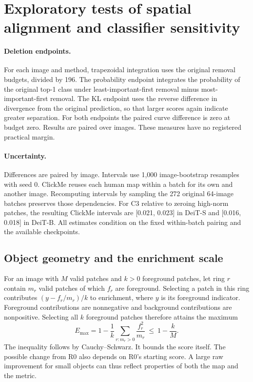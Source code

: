 \section{Exploratory tests of spatial alignment and classifier sensitivity}\label{app:explore}
\paragraph{Deletion endpoints.} For each image and method, trapezoidal integration uses the original removal budgets, divided by 196. The probability endpoint integrates the probability of the original top-1 class under least-important-first removal minus most-important-first removal. The KL endpoint uses the reverse difference in divergence from the original prediction, so that larger scores again indicate greater separation. For both endpoints the paired curve difference is zero at budget zero. Results are paired over images. These measures have no registered practical margin.
\paragraph{Uncertainty.} Differences are paired by image. Intervals use 1,000 image-bootstrap resamples with seed 0. ClickMe reuses each human map within a batch for its own and another image. Recomputing intervals by sampling the 272 original 64-image batches preserves those dependencies. For C3 relative to zeroing high-norm patches, the resulting ClickMe intervals are [0.021, 0.023] in DeiT-S and [0.016, 0.018] in DeiT-B. All estimates condition on the fixed within-batch pairing and the available checkpoints.
\begin{center}\begin{minipage}{\linewidth}
\centering\footnotesize\setlength{\tabcolsep}{3pt}

\end{minipage}\end{center}

\clearpage
\subsection{Object geometry and the enrichment scale}
For an image with $M$ valid patches and $k>0$ foreground patches, let ring $r$ contain $m_r$ valid patches of which $f_r$ are foreground. Selecting a patch in this ring contributes $(y-f_r/m_r)/k$ to enrichment, where $y$ is its foreground indicator. Foreground contributions are nonnegative and background contributions are nonpositive. Selecting all $k$ foreground patches therefore attains the maximum
\[
 E_{\max}=1-\frac{1}{k}\sum_{r:m_r>0}\frac{f_r^2}{m_r}\ \le\ 1-\frac{k}{M}.
\]
The inequality follows by Cauchy--Schwarz. It bounds the score itself. The possible change from R0 also depends on R0's starting score. A large raw improvement for small objects can thus reflect properties of both the map and the metric.

\clearpage
